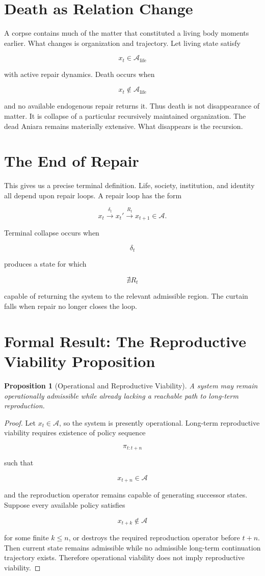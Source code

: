 \documentclass[11pt,oneside]{book}
\newtheorem{proposition}[theorem]{Proposition}
\theoremstyle{definition}
\theoremstyle{remark}
\newcommand{\A}{\mathcal{A}}
\begin{document}
\section{Death as Relation Change}

A corpse contains much of the matter that constituted a living body moments earlier. What changes is
organization and trajectory. Let living state satisfy

\[
x_t\in\A_{\mathrm{life}}
\]

with active repair dynamics. Death occurs when

\[
x_t\notin\A_{\mathrm{life}}
\]

and no available endogenous repair returns it. Thus death is not disappearance of matter. It is
collapse of a particular recursively maintained organization. The dead Aniara remains materially
extensive. What disappears is the recursion.

\section{The End of Repair}

This gives us a precise terminal definition. Life, society, institution, and identity all depend
upon repair loops. A repair loop has the form

\[
x_t \xrightarrow{\delta_t} x_t' \xrightarrow{R_t} x_{t+1}\in\A.
\]

Terminal collapse occurs when

\[
\delta_t
\]

produces a state for which

\[
\nexists R_t
\]

capable of returning the system to the relevant admissible region. The curtain falls when repair no
longer closes the loop.

\section{Formal Result: The Reproductive Viability Proposition}

\begin{proposition}[Operational and Reproductive Viability] A system may remain operationally
admissible while already lacking a reachable path to long-term reproduction. \end{proposition}
\begin{proof} Let \(x_t\in\A\), so the system is presently operational. Long-term reproductive
viability requires existence of policy sequence

\[
\pi_{t:t+n}
\]

such that

\[
x_{t+n}\in\A
\]

and the reproduction operator remains capable of generating successor states. Suppose every
available policy satisfies

\[
x_{t+k}\notin\A
\]

for some finite \(k\leq n\), or destroys the required reproduction operator before \(t+n\). Then
current state remains admissible while no admissible long-term continuation trajectory exists.
Therefore operational viability does not imply reproductive viability. \end{proof}
\end{document}
